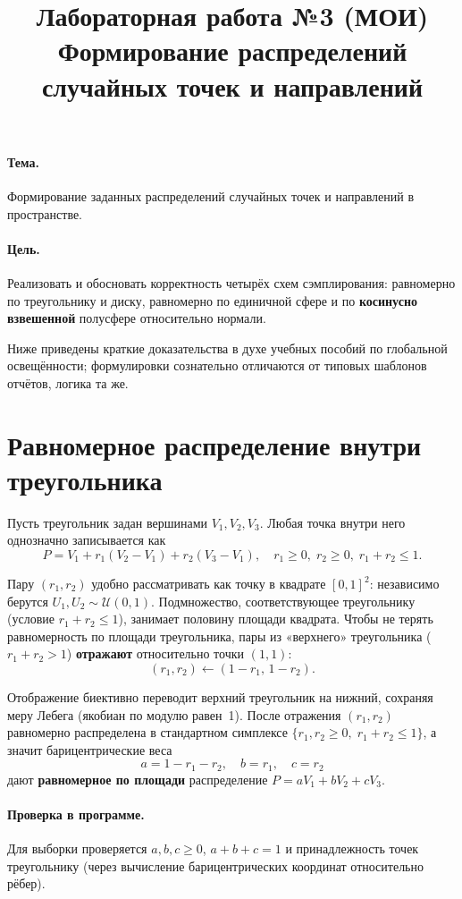 \documentclass[12pt,a4paper]{article}
\title{Лабораторная работа №3 (МОИ)\\
\large Формирование распределений случайных точек и направлений}
\author{}
\date{}
\begin{document}
\maketitle

\paragraph{Тема.}
Формирование заданных распределений случайных точек и направлений в пространстве.

\paragraph{Цель.}
Реализовать и обосновать корректность четырёх схем сэмплирования: равномерно по треугольнику и диску, равномерно по единичной сфере и по \textbf{косинусно взвешенной} полусфере относительно нормали.

Ниже приведены краткие доказательства в духе учебных пособий по глобальной освещённости; формулировки сознательно отличаются от типовых шаблонов отчётов, логика та же.

\section{Равномерное распределение внутри треугольника}

Пусть треугольник задан вершинами $V_1, V_2, V_3$. Любая точка внутри него однозначно записывается как
\[
P = V_1 + r_1(V_2 - V_1) + r_2(V_3 - V_1), \quad r_1 \ge 0,\; r_2 \ge 0,\; r_1 + r_2 \le 1.
\]

Пару $(r_1, r_2)$ удобно рассматривать как точку в квадрате $[0,1]^2$: независимо берутся $U_1, U_2 \sim \mathcal{U}(0,1)$. Подмножество, соответствующее треугольнику (условие $r_1+r_2 \le 1$), занимает половину площади квадрата. Чтобы не терять равномерность по площади треугольника, пары из «верхнего» треугольника ($r_1+r_2>1$) \textbf{отражают} относительно точки $(1,1)$:
\[
(r_1, r_2) \leftarrow (1-r_1,\, 1-r_2).
\]

Отображение биективно переводит верхний треугольник на нижний, сохраняя меру Лебега (якобиан по модулю равен~1). После отражения $(r_1,r_2)$ равномерно распределена в стандартном симплексе $\{r_1,r_2 \ge 0,\; r_1+r_2\le 1\}$, а значит барицентрические веса
\[
a = 1-r_1-r_2,\quad b = r_1,\quad c = r_2
\]
дают \textbf{равномерное по площади} распределение $P = aV_1 + bV_2 + cV_3$.

\paragraph{Проверка в программе.}
Для выборки проверяется $a,b,c \ge 0$, $a+b+c=1$ и принадлежность точек треугольнику (через вычисление барицентрических координат относительно рёбер).
\end{document}

